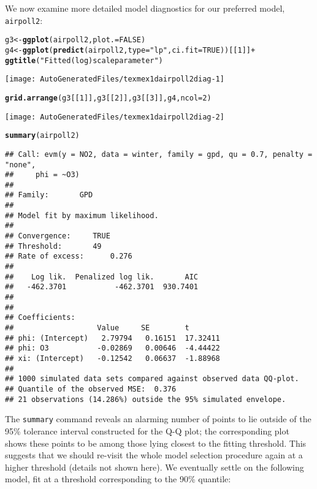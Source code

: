 \documentclass[10pt]{article}\usepackage[]{graphicx}\usepackage[]{color}
\makeatletter
\def\maxwidth{ %
  \ifdim\Gin@nat@width>\linewidth
    \linewidth
  \else
    \Gin@nat@width
  \fi
}
\newcommand{\hlnum}[1]{\textcolor[rgb]{0.686,0.059,0.569}{#1}}%
\newcommand{\hlstr}[1]{\textcolor[rgb]{0.192,0.494,0.8}{#1}}%
\newcommand{\hlopt}[1]{\textcolor[rgb]{0,0,0}{#1}}%
\newcommand{\hlstd}[1]{\textcolor[rgb]{0.345,0.345,0.345}{#1}}%
\newcommand{\hlkwb}[1]{\textcolor[rgb]{0.69,0.353,0.396}{#1}}%
\newcommand{\hlkwc}[1]{\textcolor[rgb]{0.333,0.667,0.333}{#1}}%
\newcommand{\hlkwd}[1]{\textcolor[rgb]{0.737,0.353,0.396}{\textbf{#1}}}%
\newenvironment{kframe}{%
 \def\at@end@of@kframe{}%
 \ifinner\ifhmode%
  \def\at@end@of@kframe{\end{minipage}}%
  \begin{minipage}{\columnwidth}%
 \fi\fi%
 \def\FrameCommand##1{\hskip\@totalleftmargin \hskip-\fboxsep
 \colorbox{shadecolor}{##1}\hskip-\fboxsep
     \hskip-\linewidth \hskip-\@totalleftmargin \hskip\columnwidth}%
 \MakeFramed {\advance\hsize-\width
   \@totalleftmargin\z@ \linewidth\hsize
   \@setminipage}}%
 {\par\unskip\endMakeFramed%
 \at@end@of@kframe}
\newenvironment{knitrout}{}{} %
\makeatother
\begin{document}
We now examine more detailed model diagnostics for our preferred model, {\tt airpoll2}:
\begin{knitrout}
\color{fgcolor}\begin{kframe}
\begin{alltt}
\hlstd{g3} \hlkwb{<-} \hlkwd{ggplot}\hlstd{(airpoll2,}\hlkwc{plot.}\hlstd{=}\hlnum{FALSE}\hlstd{)}
\hlstd{g4} \hlkwb{<-} \hlkwd{ggplot}\hlstd{(}\hlkwd{predict}\hlstd{(airpoll2,}\hlkwc{type}\hlstd{=}\hlstr{"lp"}\hlstd{,}\hlkwc{ci.fit}\hlstd{=}\hlnum{TRUE}\hlstd{))[[}\hlnum{1}\hlstd{]]} \hlopt{+}
    \hlkwd{ggtitle}\hlstd{(}\hlstr{"Fitted (log)scale parameter"}\hlstd{)}
\end{alltt}
\end{kframe}
\texttt{[image: AutoGeneratedFiles/texmex1dairpoll2diag-1]} 
\begin{kframe}\begin{alltt}
\hlkwd{grid.arrange}\hlstd{(g3[[}\hlnum{1}\hlstd{]],g3[[}\hlnum{2}\hlstd{]],g3[[}\hlnum{3}\hlstd{]],g4,}\hlkwc{ncol}\hlstd{=}\hlnum{2}\hlstd{)}
\end{alltt}
\end{kframe}
\texttt{[image: AutoGeneratedFiles/texmex1dairpoll2diag-2]} 
\begin{kframe}\begin{alltt}
\hlkwd{summary}\hlstd{(airpoll2)}
\end{alltt}
\begin{verbatim}
## Call: evm(y = NO2, data = winter, family = gpd, qu = 0.7, penalty = "none", 
##     phi = ~O3)
## 
## Family:       GPD 
## 
## Model fit by maximum likelihood.
## 
## Convergence:		TRUE
## Threshold:		49
## Rate of excess:		0.276
## 
##    Log lik.  Penalized log lik.       AIC
##   -462.3701           -462.3701  930.7401
## 
## 
## Coefficients:
##                   Value     SE        t       
## phi: (Intercept)   2.79794   0.16151  17.32411
## phi: O3           -0.02869   0.00646  -4.44422
## xi: (Intercept)   -0.12542   0.06637  -1.88968
## 
## 1000 simulated data sets compared against observed data QQ-plot.
## Quantile of the observed MSE:  0.376 
## 21 observations (14.286%) outside the 95% simulated envelope.
\end{verbatim}
\end{kframe}
\end{knitrout}
The {\tt summary} command reveals an alarming number of points to lie outside of the 95\% tolerance interval constructed for the Q-Q plot; the corresponding plot shows these points to be among those lying closest to the fitting threshold.  This suggests that we should re-visit the whole model selection procedure again at a higher threshold (details not shown here).  We eventually settle on the following model, fit at a threshold corresponding to the 90\% quantile:
\end{document}
